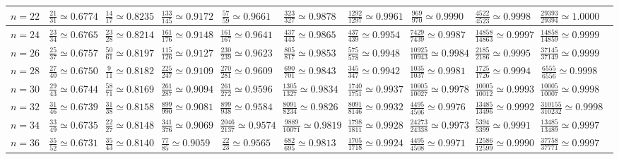 \begin{landscape}
\begin{table}
\begin{tabular}{|c||c|c|c|c|c|c|c|c|c|c}
$n=22$ & $\frac{21}{31}\simeq0.6774$ & $\frac{14}{17}\simeq0.8235$ & $\frac{133}{145}\simeq0.9172$ & $\frac{57}{59}\simeq0.9661$ & $\frac{323}{327}\simeq0.9878$ & $\frac{1292}{1297}\simeq0.9961$ & $\frac{969}{970}\simeq0.9990$ & $\frac{4522}{4523}\simeq0.9998$ & $\frac{29393}{29394}\simeq1.0000$ \\ \hline
$n=24$ & $\frac{23}{34}\simeq0.6765$ & $\frac{23}{28}\simeq0.8214$ & $\frac{161}{176}\simeq0.9148$ & $\frac{161}{167}\simeq0.9641$ & $\frac{437}{443}\simeq0.9865$ & $\frac{437}{439}\simeq0.9954$ & $\frac{7429}{7439}\simeq0.9987$ & $\frac{14858}{14863}\simeq0.9997$ & $\frac{14858}{14859}\simeq0.9999$ \\ \hline
$n=26$ & $\frac{25}{37}\simeq0.6757$ & $\frac{50}{61}\simeq0.8197$ & $\frac{115}{126}\simeq0.9127$ & $\frac{230}{239}\simeq0.9623$ & $\frac{805}{817}\simeq0.9853$ & $\frac{575}{578}\simeq0.9948$ & $\frac{10925}{10943}\simeq0.9984$ & $\frac{2185}{2186}\simeq0.9995$ & $\frac{37145}{37149}\simeq0.9999$ \\ \hline
$n=28$ & $\frac{27}{40}\simeq0.6750$ & $\frac{9}{11}\simeq0.8182$ & $\frac{225}{247}\simeq0.9109$ & $\frac{270}{281}\simeq0.9609$ & $\frac{690}{701}\simeq0.9843$ & $\frac{345}{347}\simeq0.9942$ & $\frac{1035}{1037}\simeq0.9981$ & $\frac{1725}{1726}\simeq0.9994$ & $\frac{6555}{6556}\simeq0.9998$ \\ \hline
$n=30$ & $\frac{29}{43}\simeq0.6744$ & $\frac{58}{71}\simeq0.8169$ & $\frac{261}{287}\simeq0.9094$ & $\frac{261}{272}\simeq0.9596$ & $\frac{1305}{1327}\simeq0.9834$ & $\frac{1740}{1751}\simeq0.9937$ & $\frac{10005}{10027}\simeq0.9978$ & $\frac{10005}{10012}\simeq0.9993$ & $\frac{10005}{10007}\simeq0.9998$ \\ \hline
$n=32$ & $\frac{31}{46}\simeq0.6739$ & $\frac{31}{38}\simeq0.8158$ & $\frac{899}{990}\simeq0.9081$ & $\frac{899}{938}\simeq0.9584$ & $\frac{8091}{8234}\simeq0.9826$ & $\frac{8091}{8146}\simeq0.9932$ & $\frac{4495}{4506}\simeq0.9976$ & $\frac{13485}{13496}\simeq0.9992$ & $\frac{310155}{310232}\simeq0.9998$ \\ \hline
$n=34$ & $\frac{33}{49}\simeq0.6735$ & $\frac{22}{27}\simeq0.8148$ & $\frac{341}{376}\simeq0.9069$ & $\frac{2046}{2137}\simeq0.9574$ & $\frac{9889}{10071}\simeq0.9819$ & $\frac{1798}{1811}\simeq0.9928$ & $\frac{24273}{24338}\simeq0.9973$ & $\frac{5394}{5399}\simeq0.9991$ & $\frac{13485}{13489}\simeq0.9997$ \\ \hline
$n=36$ & $\frac{35}{52}\simeq0.6731$ & $\frac{35}{43}\simeq0.8140$ & $\frac{77}{85}\simeq0.9059$ & $\frac{22}{23}\simeq0.9565$ & $\frac{682}{695}\simeq0.9813$ & $\frac{1705}{1718}\simeq0.9924$ & $\frac{4495}{4508}\simeq0.9971$ & $\frac{12586}{12599}\simeq0.9990$ & $\frac{37758}{37771}\simeq0.9997$ \\ \hline

\end{tabular}
\end{table}
\end{landscape}
